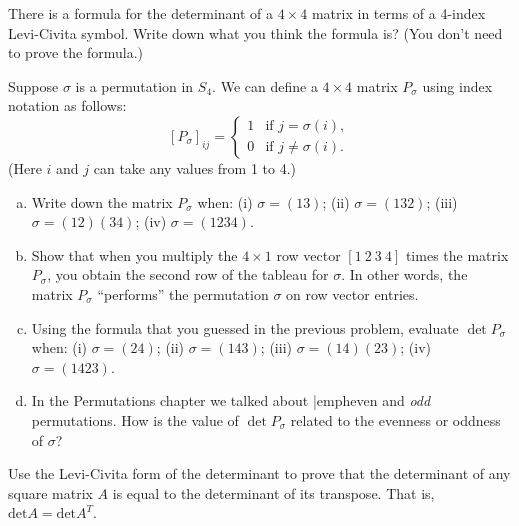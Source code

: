 \begin{exercise}{}
There is a formula for the determinant of a $4 \times 4$  matrix in terms of a 4-index Levi-Civita symbol. Write down what you think the formula is? (You don't need to prove the formula.)
\end{exercise}

\begin{exercise}{}
Suppose $\sigma$ is a permutation in $S_4$. We can define a $4 \times 4$ matrix $P_{\sigma}$ using index notation as follows:  
\[ [P_{\sigma}]_{ij} = \begin{cases} 1 &\mbox{if } j = \sigma(i), \\ 
 0 &\mbox{if } j \neq  \sigma(i).  \end{cases} \]
(Here $i$ and $j$ can take any values from 1 to 4.)  
\begin{enumerate}[(a)]
\item
Write down the matrix $P_{\sigma}$ when: (i) $\sigma = (13)$; (ii) $\sigma = (132)$; (iii) $\sigma = (12)(34)$; (iv)  $\sigma = (1234)$.
\item
Show that when you multiply the $4 \times 1$ row vector $[1~2~3~4]$ times the matrix $P_{\sigma}$, you obtain the second row of the tableau for $\sigma$.  In other words, the matrix $P_{\sigma}$ ``performs'' the permutation $\sigma$ on row vector entries.
\item
Using the formula that you guessed in the previous problem, evaluate $\det P_{\sigma}$ when: (i) $\sigma = (24)$; (ii) $\sigma = (143)$; (iii) $\sigma = (14)(23)$; (iv)  $\sigma = (1423)$.
\item
In the Permutations chapter we talked about |emph{even} and \emph{odd} permutations.  How is the value of $\det P_{\sigma}$  related to the evenness or oddness of $\sigma$?
\end{enumerate}
\end{exercise}

\begin{exercise}{}
Use the Levi-Civita form of the determinant to prove that the determinant of any square matrix $A$ is equal to the determinant of its transpose.  That is, $\text{det} A = \text{det}A^{T}$.
\end{exercise}


